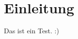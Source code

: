 \documentclass[a4paper,12pt,headings=small,ngerman,bibliography=totoc]{scrartcl}
\begin{document}
% 
% 
% 
% 
% 
% 
% 
% 
% 
% 

\section{Einleitung}

Das ist ein Test. :) \cite{Trask}


\newpage

\printbibliography[title={Literaturverzeichnis}]
\end{document}
